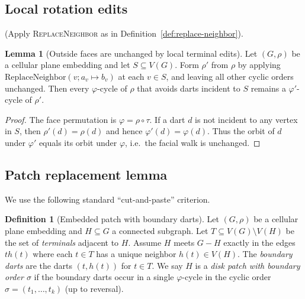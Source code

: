 \documentclass[12pt]{article}
\theoremstyle{definition}
\newtheorem{lemma}[theorem]{Lemma}
\newtheorem{definition}[theorem]{Definition}
\begin{document}
\subsection{Local rotation edits}
\label{subsec:rotation-edits}


(Apply \textsc{ReplaceNeighbor} as in Definition~\ref{def:replace-neighbor}).


\begin{lemma}[Outside faces are unchanged by local terminal edits]
\label{lem:outside-faces-unchanged}
Let $(G,\rho)$ be a cellular plane embedding and let $S\subseteq V(G)$.
Form $\rho'$ from $\rho$ by applying $\mathrm{ReplaceNeighbor}(v;a_v\mapsto b_v)$ at each $v\in S$,
and leaving all other cyclic orders unchanged.
Then every $\varphi$-cycle of $\rho$ that avoids darts incident to $S$ remains a $\varphi'$-cycle of $\rho'$.
\end{lemma}
\begin{proof}
The face permutation is $\varphi=\rho\circ\tau$.  If a dart $d$ is not incident to any vertex in $S$,
then $\rho'(d)=\rho(d)$ and hence $\varphi'(d)=\varphi(d)$.  Thus the orbit of $d$ under $\varphi'$
equals its orbit under $\varphi$, i.e.\ the facial walk is unchanged.
\end{proof}

\subsection{Patch replacement lemma}
\label{subsec:patch-replacement}

We use the following standard ``cut-and-paste'' criterion.

\begin{definition}[Embedded patch with boundary darts]
\label{def:patch}
\label{def:patch-interface}
Let $(G,\rho)$ be a cellular plane embedding and $H\subseteq G$ a connected subgraph.
Let $T\subseteq V(G)\setminus V(H)$ be the set of \emph{terminals} adjacent to $H$.
Assume $H$ meets $G-H$ exactly in the edges $t h(t)$ where each $t\in T$ has a unique neighbor $h(t)\in V(H)$.
The \emph{boundary darts} are the darts $(t,h(t))$ for $t\in T$.
We say $H$ is a \emph{disk patch with boundary order $\sigma$} if the boundary darts occur in a single
$\varphi$-cycle in the cyclic order $\sigma=(t_1,\dots,t_k)$ (up to reversal).
\end{definition}
\end{document}

